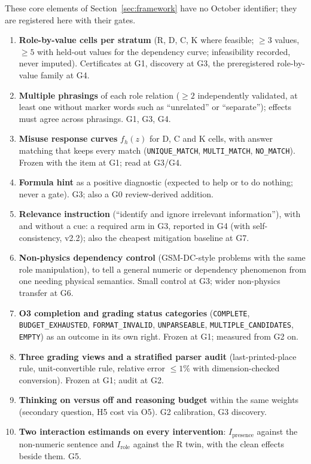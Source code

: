 \documentclass[10pt,a4paper]{article}
\begin{document}
These core elements of Section~\ref{sec:framework} have no October identifier; they are registered here with
their gates.
\begin{enumerate}
\item \textbf{Role-by-value cells per stratum} (R, D, C, K where feasible; $\geq3$ values, $\geq5$ with held-out
values for the dependency curve; infeasibility recorded, never imputed). Certificates at G1, discovery at G3,
the preregistered role-by-value family at G4.
\item \textbf{Multiple phrasings} of each role relation ($\geq2$ independently validated, at least one without
marker words such as ``unrelated'' or ``separate''); effects must agree across phrasings. G1, G3, G4.
\item \textbf{Misuse response curves} $f_h(z)$ for D, C and K cells, with answer matching that keeps every match
(\texttt{UNIQUE\_MATCH}, \texttt{MULTI\_MATCH}, \texttt{NO\_MATCH}). Frozen with the item at G1; read at G3/G4.
\item \textbf{Formula hint} as a positive diagnostic (expected to help or to do nothing; never a gate). G3; also a
G0 review-derived addition.
\item \textbf{Relevance instruction} (``identify and ignore irrelevant information''), with and without a cue: a required
arm in G3, reported in G4 (with self-consistency, v2.2); also the cheapest mitigation baseline at G7.
\item \textbf{Non-physics dependency control} (GSM-DC-style problems with the same role manipulation), to tell a
general numeric or dependency phenomenon from one needing physical semantics. Small control at G3; wider
non-physics transfer at G6.
\item \textbf{O3 completion and grading status categories} (\texttt{COMPLETE}, \texttt{BUDGET\_EXHAUSTED},
\texttt{FORMAT\_INVALID}, \texttt{UNPARSEABLE}, \texttt{MULTIPLE\_CANDIDATES}, \texttt{EMPTY}) as an outcome in its
own right. Frozen at G1; measured from G2 on.
\item \textbf{Three grading views and a stratified parser audit} (last-printed-place rule, unit-convertible rule,
relative error $\leq1\%$ with dimension-checked conversion). Frozen at G1; audit at G2.
\item \textbf{Thinking on versus off and reasoning budget} within the same weights (secondary question, H5 cost via
O5). G2 calibration, G3 discovery.
\item \textbf{Two interaction estimands on every intervention}: $I_{\text{presence}}$ against the non-numeric
sentence and $I_{\text{role}}$ against the R twin, with the clean effects beside them. G5.
\end{enumerate}
\end{document}
